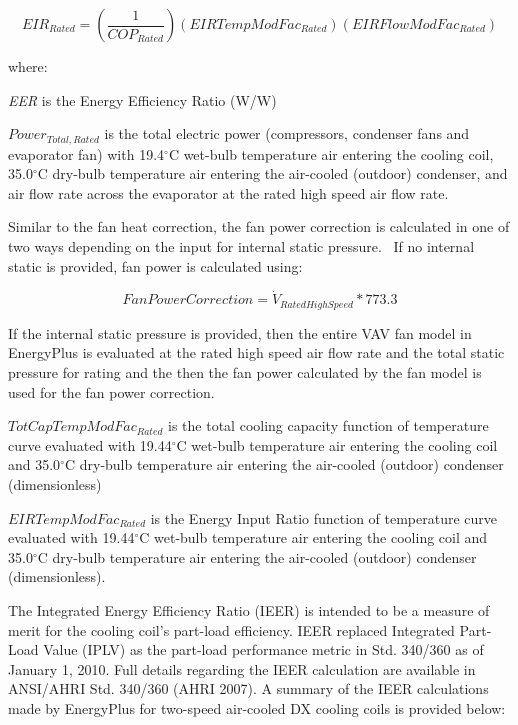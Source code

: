 \begin{equation}
  EIR_{Rated} = \left( {\frac{1}{{CO{P_{Rated}}}}} \right)(EIRTempModFa{c_{Rated}})(EIRFlowModFa{c_{Rated}})
\end{equation}

where:

\emph{EER} is the Energy Efficiency Ratio (W/W)

\(Power_{Total,Rated}\) is the total electric power (compressors, condenser fans and evaporator fan) with 19.4\(^{\circ}\)C wet-bulb temperature air entering the cooling coil, 35.0\(^{\circ}\)C dry-bulb temperature air entering the air-cooled (outdoor) condenser, and air flow rate across the evaporator at the rated high speed air flow rate.

Similar to the fan heat correction, the fan power correction is calculated in one of two ways depending on the input for internal static pressure.~ If no internal static is provided, fan power is calculated using:

\begin{equation}
  FanPowerCorrection = {\dot V_{RatedHighSpeed}} * 773.3
\end{equation}

If the internal static pressure is provided, then the entire VAV fan model in EnergyPlus is evaluated at the rated high speed air flow rate and the total static pressure for rating and the then the fan power calculated by the fan model is used for the fan power correction.

\(TotCapTempModFac_{Rated}\) is the total cooling capacity function of temperature curve evaluated with 19.44\(^{\circ}\)C wet-bulb temperature air entering the cooling coil and 35.0\(^{\circ}\)C dry-bulb temperature air entering the air-cooled (outdoor) condenser (dimensionless)

\(EIRTempModFa{c_{Rated}}\) is the Energy Input Ratio function of temperature curve evaluated with 19.44\(^{\circ}\)C wet-bulb temperature air entering the cooling coil and 35.0\(^{\circ}\)C dry-bulb temperature air entering the air-cooled (outdoor) condenser (dimensionless).

The Integrated Energy Efficiency Ratio (IEER) is intended to be a measure of merit for the cooling coil's part-load efficiency. IEER replaced Integrated Part-Load Value (IPLV) as the part-load performance metric in Std. 340/360 as of January 1, 2010. Full details regarding the IEER calculation are available in ANSI/AHRI Std. 340/360 (AHRI 2007). A summary of the IEER calculations made by EnergyPlus for two-speed air-cooled DX cooling coils is provided below:

